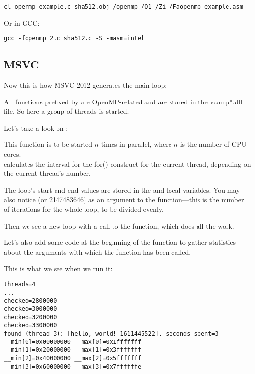 \begin{lstlisting}
cl openmp_example.c sha512.obj /openmp /O1 /Zi /Faopenmp_example.asm
\end{lstlisting}

Or in GCC:

\begin{lstlisting}
gcc -fopenmp 2.c sha512.c -S -masm=intel
\end{lstlisting}

\subsection{MSVC}

Now this is how MSVC 2012 generates the main loop:



All functions prefixed by  
are OpenMP-related and are stored in the 
vcomp*.dll file.
So here a group of threads is started.

Let's take a look on :



This function is to be started $n$ 
times in parallel, where $n$ is the number of \ac{CPU} cores.\\
calculates the interval for the for() 
construct for the current
thread, depending on the current thread's number.

The loop's start and end values are stored in the  and  local variables.
You may also notice  (or 2147483646) 
as an argument to the 
function---this is the number of iterations for the whole loop, to be divided evenly.

Then we see a new loop with a call to the 
 function, which does all the work.

Let's also add some code at the beginning of the  function to gather statistics about
the arguments with which the function has been called.

This is what we see when we run it:

\begin{lstlisting}
threads=4
...
checked=2800000
checked=3000000
checked=3200000
checked=3300000
found (thread 3): [hello, world!_1611446522]. seconds spent=3
__min[0]=0x00000000 __max[0]=0x1fffffff
__min[1]=0x20000000 __max[1]=0x3fffffff
__min[2]=0x40000000 __max[2]=0x5fffffff
__min[3]=0x60000000 __max[3]=0x7ffffffe
\end{lstlisting}

